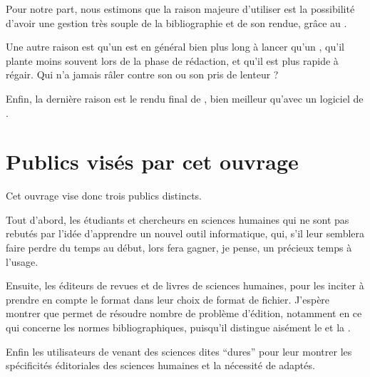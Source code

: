 Pour notre part, nous estimons que la raison majeure d'utiliser \logiciel{\LaTeX} est la possibilité d'avoir une gestion très souple de la bibliographie et de son rendue, grâce au  . 

Une autre raison est qu'un  est en général bien plus long à lancer qu'un , qu'il plante moins souvent lors de la phase de rédaction, et qu'il est plus rapide à régair. Qui n'a jamais râler contre son  ou son  pris de lenteur ?

Enfin, la dernière raison est le rendu  final de \logiciel{\LaTeX} , bien meilleur qu'avec un logiciel de .


\section{Publics visés par cet ouvrage}

Cet ouvrage vise donc trois publics distincts.

Tout d'abord, les étudiants et chercheurs en sciences humaines qui ne sont pas rebutés par l'idée d'apprendre un nouvel outil informatique, qui, s'il leur semblera faire perdre du temps au début, lors fera gagner, je pense, un précieux temps à l'usage.

Ensuite, les éditeurs de revues et de livres de sciences humaines, pour les inciter à prendre en compte le format \concept{\LaTeX} dans leur choix de format de fichier. J'espère montrer que \logiciel{\LaTeX} permet de résoudre nombre de problème d'édition, notamment en ce qui concerne les normes bibliographiques, puisqu'il distingue aisément le  et la .

Enfin les utilisateurs de \logiciel{\LaTeX} venant des sciences dites \enquote{dures} pour leur montrer les spécificités éditoriales des sciences humaines et la nécessité de  adaptés.

